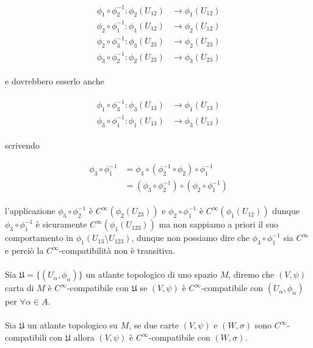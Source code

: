 \begin{align}
	\begin{split}
		\phi_{1} \circ \phi_{2}^{-1} : \phi_{2}(U_{12}) &\to \phi_{1}(U_{12})\\
		\phi_{2} \circ \phi_{1}^{-1} : \phi_{1}(U_{12}) &\to \phi_{2}(U_{12})\\
		\phi_{2} \circ \phi_{3}^{-1} : \phi_{3}(U_{23}) &\to \phi_{2}(U_{23})\\
		\phi_{3} \circ \phi_{2}^{-1} : \phi_{2}(U_{23}) &\to \phi_{3}(U_{23})
	\end{split}
\end{align}

e dovrebbero esserlo anche

\begin{align}
	\begin{split}
		\phi_{1} \circ \phi_{3}^{-1} : \phi_{3}(U_{13}) &\to \phi_{1}(U_{13})\\
		\phi_{3} \circ \phi_{1}^{-1} : \phi_{1}(U_{13}) &\to \phi_{3}(U_{13})
	\end{split}
\end{align}

scrivendo

\begin{align}
	\begin{split}
		\phi_{3} \circ \phi_{1}^{-1} &= \phi_{3} \circ (\phi_{2}^{-1} \circ \phi_{2}) \circ \phi_{1}^{-1}\\
		&= (\phi_{3} \circ \phi_{2}^{-1}) \circ (\phi_{2} \circ \phi_{1}^{-1})
	\end{split}
\end{align}

l'applicazione $ \phi_{3} \circ \phi_{2}^{-1} $ è $ C^{\infty}(\phi_{2}(U_{23})) $ e $ \phi_{2} \circ \phi_{1}^{-1} $ è $ C^{\infty}(\phi_{1}(U_{12})) $ dunque $ \phi_{3} \circ \phi_{1}^{-1} $ è sicuramente $ C^{\infty}(\phi_{1}(U_{123})) $ ma non sappiamo a priori il suo comportamento in $ \phi_{1}(U_{13} \setminus U_{123}) $, dunque non possiamo dire che $ \phi_{3} \circ \phi_{1}^{-1} $ sia $ C^{\infty} $ e perciò la $ C^{\infty} $-compatibilità non è transitiva.\\\\
%
Sia $ \mathfrak{U} = \{(U_{\alpha},\phi_{\alpha})\} $ un atlante topologico di uno spazio $ M $, diremo che $ (V,\psi) $ carta di $ M $ è $ C^{\infty} $-compatibile con $ \mathfrak{U} $ se $ (V,\psi) $ è $ C^{\infty} $-compatibile con $ (U_{\alpha},\phi_{\alpha}) $ per $ \forall \alpha \in A $.\\\\
%
Sia $ \mathfrak{U} $ un atlante topologico su $ M $, se due carte $ (V,\psi) $ e $ (W,\sigma) $ sono $ C^{\infty} $-compatibili con $ \mathfrak{U} $ allora $ (V,\psi) $ è $ C^{\infty} $-compatibile con $ (W,\sigma) $.

